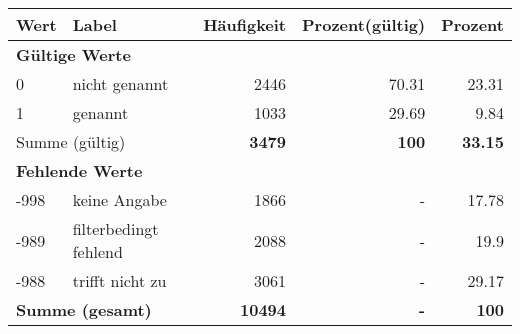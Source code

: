      \begin{longtable}{lXrrr}
     \toprule
     \textbf{Wert} & \textbf{Label} & \textbf{Häufigkeit} & \textbf{Prozent(gültig)} & \textbf{Prozent} \\
     \endhead
     \midrule
     \multicolumn{5}{l}{\textbf{Gültige Werte}}\\

     0 &
     \multicolumn{1}{X}{ nicht genannt   } &


       \num{2446} &
       \num[round-mode=places,round-precision=2]{70,31} &
         \num[round-mode=places,round-precision=2]{23,31} \\

     1 &
     \multicolumn{1}{X}{ genannt   } &


       \num{1033} &
       \num[round-mode=places,round-precision=2]{29,69} &
         \num[round-mode=places,round-precision=2]{9,84} \\
     \midrule
     \multicolumn{2}{l}{Summe (gültig)} &
       \textbf{\num{3479}} &
     \textbf{100} &
       \textbf{\num[round-mode=places,round-precision=2]{33,15}} \\
     \multicolumn{5}{l}{\textbf{Fehlende Werte}}\\
       -998 &
       keine Angabe &
         \num{1866} &
        - &
         \num[round-mode=places,round-precision=2]{17,78} \\
       -989 &
       filterbedingt fehlend &
         \num{2088} &
        - &
         \num[round-mode=places,round-precision=2]{19,9} \\
       -988 &
       trifft nicht zu &
         \num{3061} &
        - &
         \num[round-mode=places,round-precision=2]{29,17} \\
     \midrule
     \multicolumn{2}{l}{\textbf{Summe (gesamt)}} &
          \textbf{\num{10494}} &
        \textbf{-} &
        \textbf{100} \\
     \bottomrule
     \end{longtable}
     
